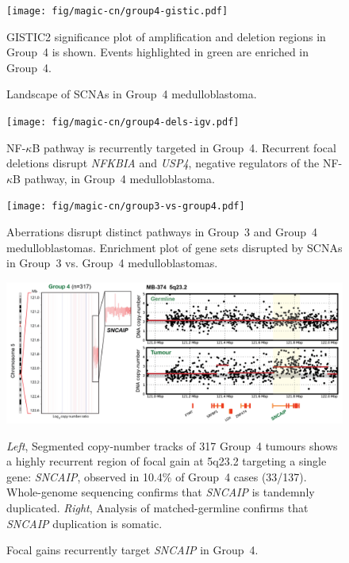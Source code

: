 \documentclass[11pt,letterpaper]{article}
\theoremstyle{definition}
\begin{document}
\clearpage

\begin{figure}[h]
	\begin{center}
		\texttt{[image: fig/magic-cn/group4-gistic.pdf]}
	\end{center}
	\caption{Landscape of SCNAs in Group~4 medulloblastoma.}
	GISTIC2 significance plot of amplification and deletion regions in Group~4 is shown. Events highlighted in green are enriched in Group~4.
	\label{fig:group4-gistic}
\end{figure}

\clearpage

\begin{figure}
	\centering
	\texttt{[image: fig/magic-cn/group4-dels-igv.pdf]}
	\caption{NF-$\kappa$B pathway is recurrently targeted in Group~4.
		Recurrent focal deletions disrupt \emph{NFKBIA} and \emph{USP4}, negative regulators of the NF-$\kappa$B pathway, in Group~4 medulloblastoma.}
	\label{fig:group4-del-igv}
\end{figure}

\begin{figure}
	\centering
	\texttt{[image: fig/magic-cn/group3-vs-group4.pdf]}
	\caption{Aberrations disrupt distinct pathways in Group~3 and Group~4 medulloblastomas.
	Enrichment plot of gene sets disrupted by SCNAs in Group~3 vs. Group~4 medulloblastomas.}
	\label{fig:group3-vs-group4}
\end{figure}

\clearpage

\begin{figure}[h]
	\begin{center}
		\includegraphics[width=\textwidth]{fig/magic-cn/sncaip-gain.png}
	\end{center}
	\caption{Focal gains recurrently target \emph{SNCAIP} in Group~4.}
	\emph{Left}, Segmented copy-number tracks of 317 Group~4 tumours shows a highly recurrent region of focal gain at 5q23.2 targeting a single gene: \emph{SNCAIP}, observed in 10.4\% of Group~4 cases (33/137). Whole-genome sequencing confirms that \emph{SNCAIP} is tandemnly duplicated. \emph{Right}, Analysis of matched-germline confirms that \emph{SNCAIP} duplication is somatic.
	\label{fig:sncaip-gain}
\end{figure}
\end{document}
